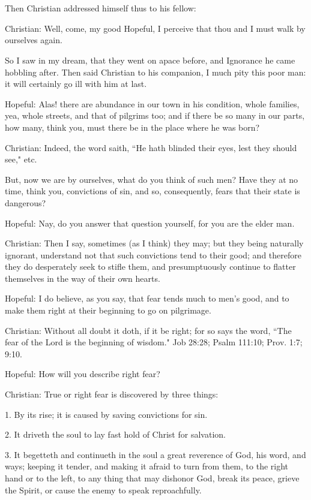 \chapter[THE TENTH STAGE]{}

Then Christian addressed himself thus to his fellow:

Christian: Well, come, my good Hopeful, I perceive that thou and I must walk by ourselves again.

So I saw in my dream, that they went on apace before, and Ignorance he came hobbling after. Then said Christian to his companion, I much pity this poor man: it will certainly go ill with him at last.

Hopeful: Alas! there are abundance in our town in his condition, whole families, yea, whole streets, and that of pilgrims too; and if there be so many in our parts, how many, think you, must there be in the place where he was born?

Christian: Indeed, the word saith, ``He hath blinded their eyes, lest they should see," etc.

But, now we are by ourselves, what do you think of such men? Have they at no time, think you, convictions of sin, and so, consequently, fears that their state is dangerous?

Hopeful: Nay, do you answer that question yourself, for you are the elder man.

Christian: Then I say, sometimes (as I think) they may; but they being naturally ignorant, understand not that such convictions tend to their good; and therefore they do desperately seek to stifle them, and presumptuously continue to flatter themselves in the way of their own hearts.

Hopeful: I do believe, as you say, that fear tends much to men's good, and to make them right at their beginning to go on pilgrimage.

Christian: Without all doubt it doth, if it be right; for so says the word, ``The fear of the Lord is the beginning of wisdom." Job 28:28; Psalm 111:10; Prov. 1:7; 9:10.

Hopeful: How will you describe right fear?

Christian: True or right fear is discovered by three things:

1. By its rise; it is caused by saving convictions for sin.

2. It driveth the soul to lay fast hold of Christ for salvation.

3. It begetteth and continueth in the soul a great reverence of God, his word, and ways; keeping it tender, and making it afraid to turn from them, to the right hand or to the left, to any thing that may dishonor God, break its peace, grieve the Spirit, or cause the enemy to speak reproachfully.

